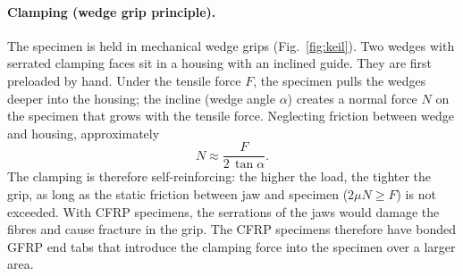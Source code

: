 \documentclass[11pt,a4paper]{article}
\begin{document}
\paragraph{Clamping (wedge grip principle).} The specimen is held in
mechanical wedge grips (Fig.~\ref{fig:keil}). Two wedges with serrated
clamping faces sit in a housing with an inclined guide. They are first
preloaded by hand. Under the tensile force $F$, the specimen pulls the wedges
deeper into the housing; the incline (wedge angle $\alpha$) creates a normal
force $N$ on the specimen that grows with the tensile force. Neglecting
friction between wedge and housing, approximately
\begin{equation}
  N \approx \frac{F}{2\,\tan\alpha}.
\end{equation}
The clamping is therefore self-reinforcing: the higher the load, the tighter
the grip, as long as the static friction between jaw and specimen
($2\mu N \geq F$) is not exceeded. With CFRP specimens, the serrations of the
jaws would damage the fibres and cause fracture in the grip. The CFRP
specimens therefore have bonded GFRP end tabs that introduce the clamping
force into the specimen over a larger area.
\end{document}
